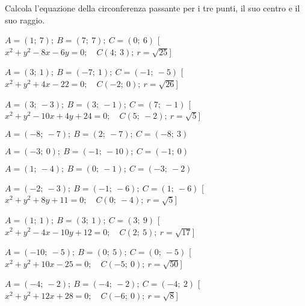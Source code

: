 \begin{esercizio}\label{ese:}
 Calcola l'equazione della circonferenza passante per i tre punti, il suo 
centro e il suo raggio.
 \begin{enumeratea}
  \item  \(A = \left (1;~7 \right );~B = \left (7;~7 \right );~C = \left (0;~6 
\right )\)
   \hfill [\(x^2 + y^2 -8x -6y  = 0; \quad C \left (4;~3 \right );~r = 
\sqrt{25}\)]
  \item  \(A = \left (3;~1 \right );~B = \left (-7;~1 \right );~C = \left 
(-1;~-5 \right )\)
   \hfill [\(x^2 + y^2 +4x -22 = 0; \quad C \left (-2;~0 \right );~r = 
\sqrt{26}\)]
  \item  \(A = \left (3;~-3 \right );~B = \left (3;~-1 \right );~C = \left 
(7;~-1 \right )\)
   \hfill [\(x^2 + y^2 -10x +4y +24 = 0; \quad C \left (5;~-2 \right );~r = 
\sqrt{5}\)]
  \item  \(A = \left (-8;~-7 \right );~B = \left (2;~-7 \right );~C = \left 
(-8;~3 \right )\)\\
   \makebox[\linewidth][r]
   {[\(x^2 + y^2 +6x +4y -37 = 0; \quad C \left (-3;~-2 \right );~r = 
\sqrt{50}\)]}
  \item  \(A = \left (-3;~0 \right );~B = \left (-1;~-10 \right );~C = 
\left 
(-1;~0 \right )\)\\
   \makebox[\linewidth][r]
   {[\(x^2 + y^2 +4x +10y +3 = 0; \quad C \left (-2;~-5 \right );~r = 
\sqrt{26}\)]}
  \item  \(A = \left (1;~-4 \right );~B = \left (0;~-1 \right );~C = \left 
(-3;~-2 \right )\)\\
   \makebox[\linewidth][r]
   {[\(x^2 + y^2 +2x +6y +5 = 0; \quad C \left (-1;~-3 \right );~r = 
\sqrt{5}\)]}
  \item  \(A = \left (-2;~-3 \right );~B = \left (-1;~-6 \right );~C = 
\left 
(1;~-6 \right )\)
   \hfill [\(x^2 + y^2 +8y +11 = 0; \quad C \left (0;~-4 \right );~r = 
\sqrt{5}\)]
  \item  \(A = \left (1;~1 \right );~B = \left (3;~1 \right );~C = \left 
(3;~9 
\right )\)
   \hfill [\(x^2 + y^2 -4x -10y +12 = 0; \quad C \left (2;~5 \right );~r = 
\sqrt{17}\)]
  \item  \(A = \left (-10;~-5 \right );~B = \left (0;~5 \right );~C = \left 
(0;~-5 \right )\)
   \hfill [\(x^2 + y^2 +10x -25 = 0; \quad C \left (-5;~0 \right );~r = 
\sqrt{50}\)]
  \item  \(A = \left (-4;~-2 \right );~B = \left (-4;~-2 \right );~C = 
\left 
(-4;~2 \right )\)
   \hfill [\(x^2 + y^2 +12x +28 = 0; \quad C \left (-6;~0 \right );~r = 
\sqrt{8}\)]
 \end{enumeratea}
\end{esercizio}


